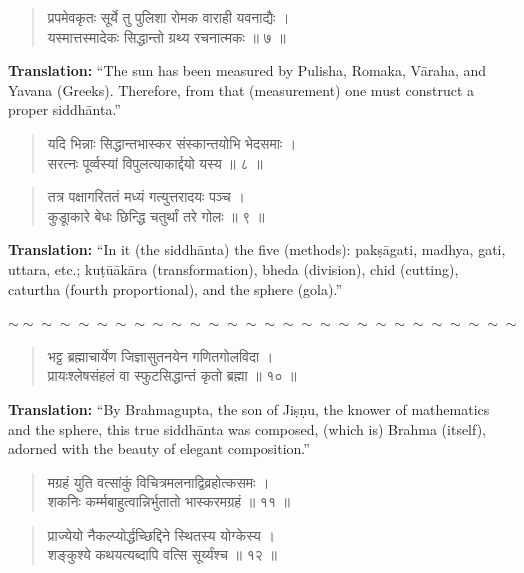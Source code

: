\documentclass[11pt,a4paper]{article}
\newcommand{\dev}[1]{{\devanagarifont #1}}
\newenvironment{shloka}
  {\begin{verse}\devanagarifont\color{versecolor}}
  {\end{verse}}
\newcommand{\wavydivider}{\begin{center}$\sim\sim\sim\sim\sim\sim\sim\sim\sim\sim\sim\sim\sim\sim\sim\sim\sim\sim\sim\sim\sim\sim\sim\sim\sim\sim\sim\sim$\end{center}}
\begin{document}
\begin{shloka}
\dev{प्रपमेवकृतः सूर्ये तु पुलिशा रोमक वाराही यवनाद्यैः ।}\\
\dev{यस्मात्तस्मादेकः सिद्धान्तो ग्रथ्य रचनात्मकः ॥ ७ ॥}
\end{shloka}

\textbf{Translation:} ``The sun has been measured by Pulisha, Romaka, Vāraha, and Yavana (Greeks). Therefore, from that (measurement) one must construct a proper siddhānta.''

\begin{shloka}
\dev{यदि भिन्नाः सिद्धान्तभास्कर संस्कान्तयोभि भेदसमाः ।}\\
\dev{सरत्नः पूर्व्वस्यां विपुलत्याकार्द्दयो यस्य ॥ ८ ॥}
\end{shloka}

\begin{shloka}
\dev{तत्र पक्षागरिततं मध्यं गत्युत्तरादयः पञ्च ।}\\
\dev{कुडूाकारे बेधः छिन्द्धि चतुर्थां तरे गोलः ॥ ९ ॥}
\end{shloka}

\textbf{Translation:} ``In it (the siddhānta) the five (methods): pakṣāgati, madhya, gati, uttara, etc.; kuṭūākāra (transformation), bheda (division), chid (cutting), caturtha (fourth proportional), and the sphere (gola).''

\wavydivider

\begin{shloka}
\dev{भट्ट ब्रह्माचार्येण जिज्ञासुतनयेन गणितगोलविदा ।}\\
\dev{प्रायःश्लेषसंहलं वा स्फुटसिद्धान्तं कृतो ब्रह्मा ॥ १० ॥}
\end{shloka}

\textbf{Translation:} ``By Brahmagupta, the son of Jiṣṇu, the knower of mathematics and the sphere, this true siddhānta was composed, (which is) Brahma (itself), adorned with the beauty of elegant composition.''

\begin{shloka}
\dev{मग्रहं युति वत्सांकुं विचित्रमलनाद्विव्रहोत्कसमः ।}\\
\dev{शकनिः कर्म्मबाहुत्वान्निर्भुतातो भास्करमग्रहं ॥ ११ ॥}
\end{shloka}

\begin{shloka}
\dev{प्राज्येयो नैकल्प्योर्द्धच्छिद्दिने स्थितस्य योग्केस्य ।}\\
\dev{शङ्कुश्ये कथयत्यब्दापि वत्सि सूर्य्यंश्च ॥ १२ ॥}
\end{shloka}
\end{document}
